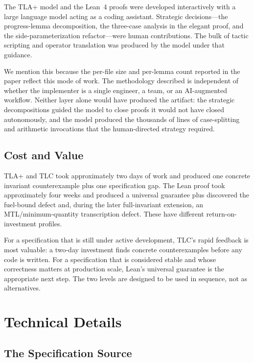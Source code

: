 \documentclass[11pt,a4paper]{article}
\begin{document}
The TLA+ model and the Lean~4 proofs were developed interactively with
a large language model acting as a coding assistant. Strategic decisions---the progress-lemma decomposition, the
three-case analysis in the elegant proof, and the side-parameterization
refactor---were human contributions. The bulk of tactic scripting and
operator translation was produced by the model under that guidance.

We mention this because the per-file size and per-lemma count reported
in the paper reflect this mode of work. The methodology described is
independent of whether the implementer is a single engineer, a team, or
an AI-augmented workflow. Neither layer alone would have produced the
artifact: the strategic decompositions guided the model to close proofs
it would not have closed autonomously, and the model produced the
thousands of lines of case-splitting and arithmetic invocations that
the human-directed strategy required.

\subsection{Cost and Value}
\label{sec:lessons-cost}

TLA+ and TLC took approximately two days of work and produced one
concrete invariant counterexample plus one specification gap.
The Lean proof took approximately four weeks and produced a universal
guarantee plus discovered the fuel-bound defect and, during the later
full-invariant extension, an MTL/minimum-quantity transcription defect.
These have different return-on-investment profiles.

For a specification that is still under active development, TLC's rapid
feedback is most valuable: a two-day investment finds concrete
counterexamples before any code is written. For a specification that is
considered stable and whose correctness matters at production scale,
Lean's universal guarantee is the appropriate next step. The two levels
are designed to be used in sequence, not as alternatives.


\section{Technical Details}
\label{sec:technical}

\subsection{The Specification Source}
\label{sec:spec-source}
\end{document}
